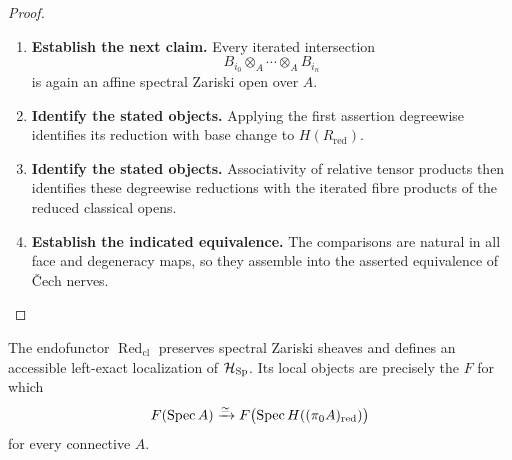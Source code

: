 \begin{proof}
\begin{enumerate}[label=\textup{(\arabic*)}]
    Let \(\{\Spec(B_i)\to\Spec(A)\}\) be a finite affine spectral Zariski
    covering family.
    \item \textbf{Establish the next claim.}
    Every iterated intersection
    \[
    B_{i_0}\otimes_A\cdots\otimes_AB_{i_n}
    \]
    is again an affine spectral Zariski open over \(A\).
    \item \textbf{Identify the stated objects.}
    Applying the first
    assertion degreewise identifies its reduction with base change to
    \(H(R_{\mathrm{red}})\).
    \item \textbf{Identify the stated objects.}
    Associativity of relative tensor products then
    identifies these degreewise reductions with the iterated fibre products of
    the reduced classical opens.
    \item \textbf{Establish the indicated equivalence.}
    The comparisons are natural in all face and
    degeneracy maps, so they assemble into the asserted equivalence of
    \v{C}ech nerves.
\end{enumerate}
\end{proof}

\begin{proposition}
\label{prop:reduced-classical-localization}
The endofunctor \(\operatorname{Red}_{\mathrm{cl}}\) preserves spectral Zariski sheaves and defines
an accessible left-exact localization of \(\mathcal H_{\operatorname{Sp}}\). Its local
objects are precisely the \(F\) for which
\[
  F(\operatorname{Spec} A)
  \xrightarrow{\simeq}
  F\bigl(\operatorname{Spec} H((\pi_0A)_{\mathrm{red}})\bigr)
\]
for every connective \(A\).
\end{proposition}

